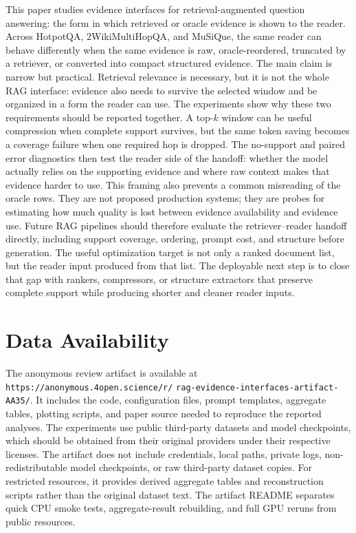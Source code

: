 \documentclass[a4paper,fleqn]{cas-sc}
\begin{document}
This paper studies evidence interfaces for retrieval-augmented question
answering: the form in which retrieved or oracle evidence is shown to the
reader. Across HotpotQA, 2WikiMultiHopQA, and MuSiQue, the same reader can
behave differently when the same evidence is raw, oracle-reordered, truncated
by a retriever, or converted into compact structured evidence. The main claim
is narrow but practical. Retrieval relevance is necessary, but it is not the
whole RAG interface: evidence also needs to survive the selected window and be
organized in a form the reader can use. The experiments show why these two
requirements should be reported together. A top-$k$ window can be useful
compression when complete support survives, but the same token saving becomes
a coverage failure when one required hop is dropped. The no-support and paired
error diagnostics then test the reader side of the handoff: whether the model
actually relies on the supporting evidence and where raw context makes that
evidence harder to use. This framing also prevents a common misreading of the
oracle rows. They are not proposed production systems; they are probes for
estimating how much quality is lost between evidence availability and evidence
use. Future RAG pipelines should therefore evaluate the retriever--reader
handoff directly, including support coverage, ordering, prompt cost, and
structure before generation. The useful optimization target is not only a
ranked document list, but the reader input produced from that list. The
deployable next step is to close that gap with rankers, compressors, or
structure extractors that preserve complete support while producing shorter and
cleaner reader inputs.

\section*{Data Availability}

The anonymous review artifact is available at
\texttt{https://anonymous.4open.science/r/}\linebreak
\texttt{rag-evidence-interfaces-artifact-AA35/}. It includes the code,
configuration files, prompt templates, aggregate tables, plotting scripts, and
paper source needed to reproduce the reported analyses. The experiments use
public third-party datasets and model checkpoints, which should be obtained
from their original providers under their respective licenses. The artifact
does not include credentials, local paths, private logs, non-redistributable
model checkpoints, or raw third-party dataset copies. For restricted resources,
it provides derived aggregate tables and reconstruction scripts rather than the
original dataset text. The artifact README separates quick CPU smoke tests,
aggregate-result rebuilding, and full GPU reruns from public resources.
\end{document}
